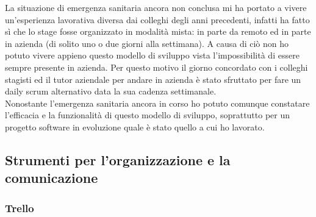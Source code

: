La situazione di emergenza sanitaria ancora non conclusa mi ha portato a vivere un'esperienza lavorativa diversa dai colleghi degli anni precedenti, infatti ha fatto sì che lo stage fosse organizzato in modalità mista: in parte da remoto ed in parte in azienda (di solito uno o due giorni alla settimana). A causa di ciò non ho potuto vivere appieno questo modello di sviluppo vista l'impossibilità di essere sempre presente in azienda. Per questo motivo il giorno concordato con i colleghi stagisti ed il tutor aziendale per andare in azienda è stato sfruttato per fare un daily scrum alternativo data la sua cadenza settimanale.\\ 
Nonostante l'emergenza sanitaria ancora in corso ho potuto comunque constatare l’efficacia e la funzionalità di questo modello di sviluppo, soprattutto per un progetto software in evoluzione quale è stato quello a cui ho lavorato.\\

\subsection{Strumenti per l'organizzazione e la comunicazione}

\subsubsection{Trello}

